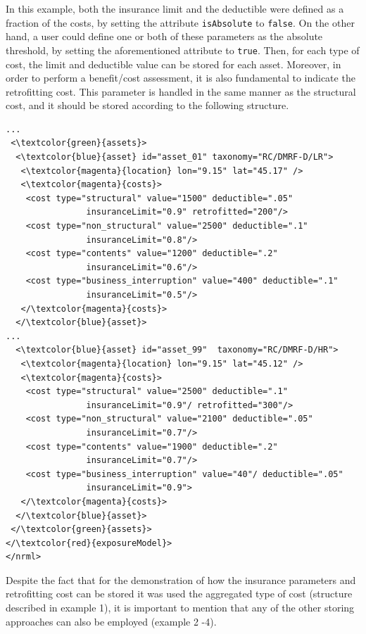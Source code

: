 In this example, both the insurance limit and the deductible were defined as a fraction of the costs, by setting the attribute \Verb+isAbsolute+ to \Verb+false+. On the other hand, a user could define one or both of these parameters as the absolute threshold, by setting the aforementioned attribute to \Verb+true+. Then, for each type of cost, the limit and deductible value can be stored for each asset.
Moreover, in order to perform a benefit/cost assessment, it is also fundamental to indicate the retrofitting cost. This parameter is handled in the same manner as the structural cost, and it should be stored according to the following structure.

\begin{Verbatim}[frame=single, commandchars=\\\{\}, samepage=false]
...
 <\textcolor{green}{assets}>
  <\textcolor{blue}{asset} id="asset_01" taxonomy="RC/DMRF-D/LR">
   <\textcolor{magenta}{location} lon="9.15" lat="45.17" />
   <\textcolor{magenta}{costs}>
    <cost type="structural" value="1500" deductible=".05" 
                insuranceLimit="0.9" retrofitted="200"/>
    <cost type="non_structural" value="2500" deductible=".1" 
                insuranceLimit="0.8"/>
    <cost type="contents" value="1200" deductible=".2" 
                insuranceLimit="0.6"/>
    <cost type="business_interruption" value="400" deductible=".1" 
                insuranceLimit="0.5"/>
   </\textcolor{magenta}{costs}>
  </\textcolor{blue}{asset}>
...
  <\textcolor{blue}{asset} id="asset_99"  taxonomy="RC/DMRF-D/HR">
   <\textcolor{magenta}{location} lon="9.15" lat="45.12" />
   <\textcolor{magenta}{costs}>
    <cost type="structural" value="2500" deductible=".1" 
                insuranceLimit="0.9"/ retrofitted="300"/>
    <cost type="non_structural" value="2100" deductible=".05" 
                insuranceLimit="0.7"/>
    <cost type="contents" value="1900" deductible=".2" 
                insuranceLimit="0.7"/>
    <cost type="business_interruption" value="40"/ deductible=".05" 
                insuranceLimit="0.9">
   </\textcolor{magenta}{costs}>
  </\textcolor{blue}{asset}>
 </\textcolor{green}{assets}>
</\textcolor{red}{exposureModel}>
</nrml>
\end{Verbatim}

Despite the fact that for the demonstration of how the insurance parameters and retrofitting cost can be stored it was used the aggregated type of cost (structure described in example 1), it is important to mention that any of the other storing approaches can also be employed (example 2 -4).

